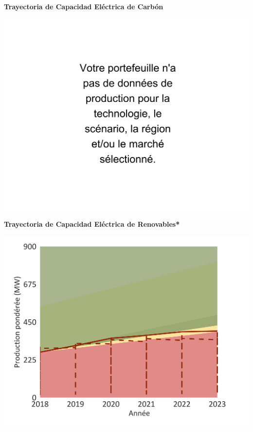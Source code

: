 \documentclass[10pt,table]{article}\usepackage[]{graphicx}\usepackage[]{color}
\begin{document}
	\begin{minipage}[t]{.49\linewidth}
		\textbf{Trayectoria de Capacidad Eléctrica de Carbón}
		
		\includegraphics[trim = {0 0cm 0 0},width=1\linewidth]{ReportOutputs/Fig17}
		
		\textbf{Trayectoria de Capacidad Eléctrica de Renovables* }
		
		\includegraphics[trim = {0 0cm 0 0},width=.99\linewidth]{ReportOutputs/Fig18}
	\end{minipage}	
	\hspace{.02\linewidth}
\end{document}
